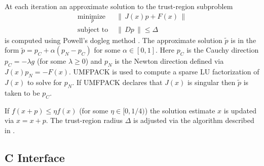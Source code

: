 \documentclass[10pt]{article}
\newcommand{\solverf}{\sffamily}
\newcommand{\norm}[1]{\left\lVert\,#1\,\right\rVert}
\newcommand{\minimize}{\text{minimize }}
\newcommand{\st}{\text{subject to }}
\newcommand{\umfpack}{{\solverf UMFPACK}}
\begin{document}
At each iteration an approximate solution to the trust-region subproblem
\begin{equation}
\begin{array}{ll}
\underset{p}{\minimize} & \norm{J(x) p + F(x)}\\
\st                     & \norm{Dp} \le \Delta
\end{array}
\label{trustregionsubproblem}
\end{equation}
is computed using Powell's dogleg method
\cite{powellhybrid,powelldogleg}.  The approximate solution
$\tilde{p}$ is in the form $\tilde{p} = p_C + \alpha(p_N - p_C)$ for
some $\alpha \in [0,1]$. Here $p_C$ is the Cauchy direction $p_C =
-\lambda g$ (for some $\lambda \ge 0$) and $p_N$ is the Newton
direction defined via $J(x) p_N = -F(x)$. \umfpack{}
\cite{acmtomsumfpack} is used to compute a sparse LU factorization of
$J(x)$ to solve for $p_N$. If \umfpack{} declares that $J(x)$ is
singular then $\tilde{p}$ is taken to be $p_C$.

If $f(x+p) \le \eta f(x)$ (for some $\eta \in [0,1/4)$) the solution
estimate $x$ is updated via $x = x + p$.  The trust-region radius
$\Delta$ is adjusted via the algorithm described in
\cite[pp. 291]{nocedalwright}.



\subsection*{C Interface}
\end{document}

